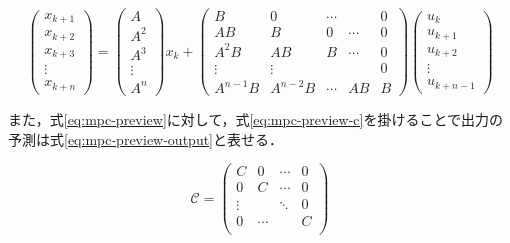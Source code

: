 \begin{equation}
  \begin{pmatrix}
    x_{k+1} \\x_{k+2}\\x_{k+3}\\
    \vdots  \\ x_{k+n}
  \end{pmatrix}
  =
  \begin{pmatrix}
    A      \\A^2\\A^3\\
    \vdots \\ A^n
  \end{pmatrix}
  x_{k} +
  \begin{pmatrix}
    B        & 0        & \cdots &        & 0 \\
    AB       & B        & 0      & \cdots & 0 \\
    A^2B     & AB       & B      & \cdots & 0 \\
    \vdots   & \vdots   &        &        & 0 \\
    A^{n-1}B & A^{n-2}B & \cdots & AB     & B
  \end{pmatrix}
  \begin{pmatrix}
    u_{k}   \\
    u_{k+1} \\
    u_{k+2} \\
    \vdots  \\
    u_{k+n-1}
  \end{pmatrix}
  \label{eq:mpc-preview}
\end{equation}

また，式\eqref{eq:mpc-preview}に対して，式\eqref{eq:mpc-preview-c}を掛けることで出力の予測は式\eqref{eq:mpc-preview-output}と表せる．

\begin{equation}
  \mathcal{C} =
  \begin{pmatrix}
    C      & 0 & \cdots & 0 \\
    0      & C & \cdots & 0 \\
    \vdots &   &    \ddots  & 0 \\
    0 & \cdots & & C\\
  \end{pmatrix}
  \label{eq:mpc-preview-c}
\end{equation}

